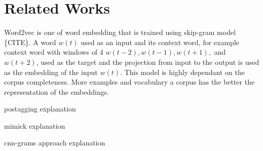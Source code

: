 \chapter{Related Works}
\label{chap:related}

Word2vec is one of word embedding that is trained using skip-gram
model \{CITE\}. A word $w(t)$ used as an input and its context word, for
example context word with windows of 4 $w(t-2), w(t-1), w(t+1),$ and
$w(t+2)$, used as the target and the projection from input to the
output is used as the embedding of the input $w(t)$. This model is
highly dependant on the corpus completeness. More examples and
vocabulary a corpus has the better the representation of the embeddings.

postagging explanation

mimick explanation

cnn-grams approach explanation